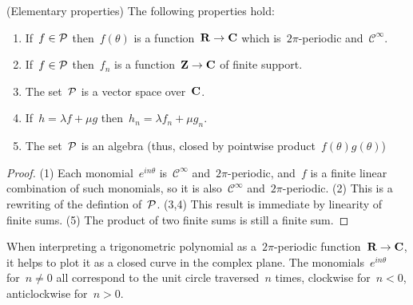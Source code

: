 \begin{proposition}
(Elementary properties)
The following properties hold:
\begin{enumerate}
	\item If~$f\in\mathcal{P}$ then~$f(\theta)$ is a
		function~$\mathbf{R}\to\mathbf{C}$ which is~$2\pi$-periodic
		and~$\mathcal{C}^\infty$.
	\item If~$f\in\mathcal{P}$ then~$f_n$ is a function~$\mathbf{Z}\to\mathbf{C}$ of finite
		support.
	\item The set~$\mathcal{P}$ is a vector space over~$\mathbf{C}$.
	\item If~$h=\lambda f+\mu g$ then~$h_n=\lambda f_n+\mu g_n$.
	\item The set~$\mathcal{P}$ is an algebra (thus, closed by
		pointwise product~$f(\theta)g(\theta)$)
\end{enumerate}
\end{proposition}

\begin{proof}
(1) Each monomial~$e^{in\theta}$ is~$\mathcal{C}^\infty$
	and~$2\pi$-periodic, and~$f$ is a finite linear
	combination of such monomials, so it is
	also~$\mathcal{C}^\infty$ and~$2\pi$-periodic.
(2) This is a rewriting of the defintion of~$\mathcal{P}$.
(3,4) This result is immediate by linearity of finite sums.
(5) The product of two finite sums is still a finite sum.
\end{proof}


When interpreting a trigonometric polynomial as a~$2\pi$-periodic
function~$\mathbf{R}\to\mathbf{C}$, it helps to plot it as a closed curve in the complex
plane.  The monomials~$e^{in\theta}$ for~$n\neq 0$ all correspond to the unit
circle traversed~$n$ times, clockwise for~$n<0$, anticlockwise for~$n>0$.

